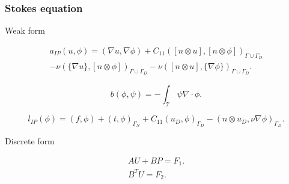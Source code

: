 \documentclass{beamer}
\begin{document}
\begin{frame}
\frametitle{Stokes equation}
\begin{block}{Weak form}

\begin{equation}
\begin{split}
a_{IP}(u,\phi) = (\nabla u, \nabla \phi) + C_{11} ([n \otimes u],[n \otimes \phi])_{\Gamma \cup \Gamma_D} \\ - \nu (\{\nabla u\},[n \otimes \phi])_{\Gamma \cup \Gamma_D} - \nu ([n \otimes u],\{\nabla \phi\})_{\Gamma \cup \Gamma_D} \textrm{.}
\end{split}
\end{equation}

\begin{equation}
b(\phi,\psi) = -\int_{\mathcal{T}} \psi \nabla \cdot \phi \textrm{.}
\end{equation}

\begin{equation}
l_{IP}(\phi) = (f,\phi) + (t,\phi)_{\Gamma_N} + C_{11} (u_D,\phi)_{\Gamma_D} - (n \otimes u_D, \nu \nabla \phi)_{\Gamma_D} \textrm{.}
\end{equation}

\end{block}

\begin{block}{Discrete form}

\begin{equation} \label{stokes discrete_ch3}
\begin{split}
AU + BP = F_1 \textrm{.}\\
B^T U  = F_2 \textrm{.}
\end{split}
\end{equation}

\end{block}
\end{frame}
\end{document}
